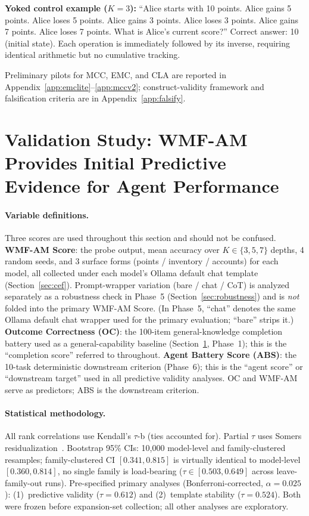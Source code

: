 \documentclass{article}
\begin{document}
\textbf{Yoked control example ($K{=}3$):} ``Alice starts with 10
points. Alice gains 5 points. Alice loses 5 points. Alice gains 3
points. Alice loses 3 points. Alice gains 7 points. Alice loses 7
points. What is Alice's current score?'' Correct answer: 10 (initial
state). Each operation is immediately followed by its inverse, requiring
identical arithmetic but no cumulative tracking.

Preliminary pilots for MCC, EMC, and CLA are reported in
Appendix~\ref{app:emclite}--\ref{app:mccv2}; construct-validity
framework and falsification criteria are in Appendix~\ref{app:falsify}.

\section{Validation Study: WMF-AM Provides Initial Predictive Evidence for Agent Performance}
\label{sec:pilot}

\paragraph{Variable definitions.}
Three scores are used throughout this section and should not be confused.
\textbf{WMF-AM Score}: the probe output, mean accuracy over $K\in\{3,5,7\}$ depths,
4 random seeds, and 3 surface forms (points / inventory / accounts) for each model,
all collected under each model's Ollama default chat template (Section~\ref{sec:cef}).
Prompt-wrapper variation (bare / chat / CoT) is analyzed separately as a robustness
check in Phase~5 (Section~\ref{sec:robustness}) and is \emph{not} folded into the
primary WMF-AM Score.
(In Phase~5, ``chat'' denotes the same Ollama default chat wrapper used
for the primary evaluation; ``bare'' strips it.)
\textbf{Outcome Correctness (OC)}: the 100-item general-knowledge completion
battery used as a general-capability baseline (Section~\ref{sec:pilot},
Phase~1); this is the ``completion score'' referred to throughout.
\textbf{Agent Battery Score (ABS)}: the 10-task deterministic downstream
criterion (Phase~6); this is the ``agent score'' or ``downstream target''
used in all predictive validity analyses.
OC and WMF-AM serve as predictors; ABS is the downstream criterion.

\paragraph{Statistical methodology.}
All rank correlations use Kendall's $\tau$-b (ties accounted for).
Partial $\tau$ uses Somers residualization~\citep{somers1962new}.
Bootstrap 95\% CIs: 10{,}000 model-level and family-clustered resamples;
family-clustered CI $[0.341, 0.815]$ is virtually identical to
model-level $[0.360, 0.814]$, no single family is load-bearing
($\tau \in [0.503, 0.649]$ across leave-family-out runs). Pre-specified primary analyses (Bonferroni-corrected, $\alpha{=}0.025$):
(1)~predictive validity ($\tau = 0.612$) and (2)~template stability ($\tau = 0.524$).
Both were frozen before expansion-set collection; all other analyses are exploratory.
\end{document}
